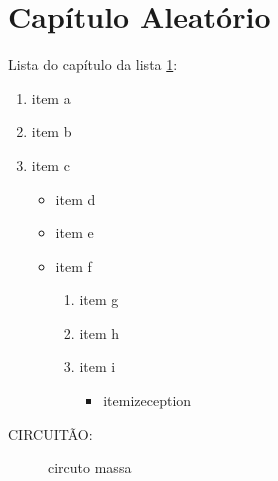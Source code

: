 \chapter{Capítulo Aleatório}
\label{chap:CapAle}

Lista do capítulo da lista \ref{chap:CapAle}:

\begin{enumerate}
\item item a
\item item b
\item item c
	\begin{itemize}
	\item item d
	\item item e
	\item item f
		\begin{enumerate}[label*=\arabic*.]
		\item item g
		\item item h
		\item item i
			\begin{itemize}
			\item itemizeception
			\end{itemize}
		\end{enumerate}
	\end{itemize}
\end{enumerate}

CIRCUITÃO:

\begin{figure}[!htb] \label{fig:circuitevers}
\centering
{}
\caption{circuto massa}
\end{figure}